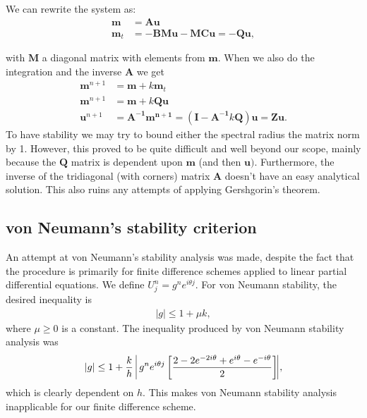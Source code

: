 We can rewrite the system as:
\begin{align*}
\bm{m} &= \bm{Au} \\
\bm{m}_t &= -\bm{BMu} - \bm{MCu} = \bm{-Qu},
\end{align*}

with $\bm{M}$ a diagonal matrix with elements from $\bm{m}$. When we also do the integration and the inverse $\bm{A}$ we get
\begin{align*}
\bm{m}^{n+1} &= \bm{m} + k\bm{m}_t \\
\bm{m}^{n+1} &= \bm{m} + k\bm{Qu} \\
\bm{u}^{n+1} &= \bm{A^{-1}m^{n+1}} = \left(\bm{I} -\bm{A^{-1}}k\bm{Q}\right)\bm{u} = \bm{Zu}.
\end{align*}
To have stability we may try to bound either the spectral radius the matrix norm by 1. However, this proved to be quite difficult and well beyond our scope, mainly because the $\bm{Q}$ matrix is dependent upon $\bm{m}$ (and then $\bm{u})$. Furthermore, the inverse of the tridiagonal (with corners) matrix $\bm{A}$ doesn't have an easy analytical solution. This also ruins any attempts of applying Gershgorin's theorem.

\subsection*{von Neumann's stability criterion}
An attempt at von Neumann's stability analysis was made, despite the fact that the procedure is primarily for finite difference schemes applied to linear partial differential equations. We define $U_{j}^{n} = g^{n}e^{i\theta j}$. For von Neumann stability, the desired inequality is
\begin{align}
|g| \leq 1 + \mu k,
\end{align}
where $\mu \geq 0$ is a constant. 
The inequality produced by von Neumann stability analysis was
\begin{align}
|g| \leq 1+ \frac{k}{h}\;\vline \;g^{n}e^{i\theta j}\left[\frac{2-2e^{-2i\theta}+ e^{i\theta} - e^{-i\theta}}{2}\right]\vline,
\end{align}
which is clearly dependent on $h$. This makes von Neumann stability analysis inapplicable for our finite difference scheme.

